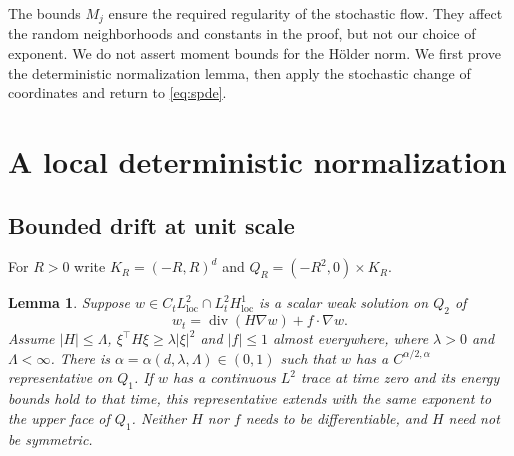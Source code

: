 \documentclass[11pt]{article}
\newtheorem{lemma}[theorem]{Lemma}
\newcommand{\diver}{\operatorname{div}}
\begin{document}
The bounds $M_j$ ensure the required regularity of the stochastic flow.
They affect the random neighborhoods and constants in the proof, but not our
choice of exponent. We do not assert moment bounds for the H\"older norm.
We first prove the deterministic normalization lemma, then apply the
stochastic change of coordinates and return to \eqref{eq:spde}.

\section{A local deterministic normalization}

\subsection{Bounded drift at unit scale}
For $R>0$ write $K_R=(-R,R)^d$ and $Q_R=(-R^2,0)\times K_R$.

\begin{lemma}\label{lem:unit}
Suppose $w\in C_tL^2_{\mathrm{loc}}\cap L^2_tH^1_{\mathrm{loc}}$ is a
scalar weak solution on $Q_2$ of
\begin{equation}\label{eq:unit}
 w_t=\diver(H\nabla w)+f\cdot\nabla w.
\end{equation}
Assume $|H|\le\Lambda$, $\xi^\top H\xi\ge\lambda|\xi|^2$ and
$|f|\le1$ almost everywhere, where $\lambda>0$ and $\Lambda<\infty$.
There is $\alpha=\alpha(d,\lambda,\Lambda)\in(0,1)$ such that $w$ has a
$C^{\alpha/2,\alpha}$ representative on $Q_1$. If $w$ has a continuous
$L^2$ trace at time zero and its energy bounds hold to that time, this
representative extends with the same exponent to the upper face of $Q_1$.
Neither $H$ nor $f$ needs to be differentiable, and $H$ need not be symmetric.
\end{lemma}
\end{document}
